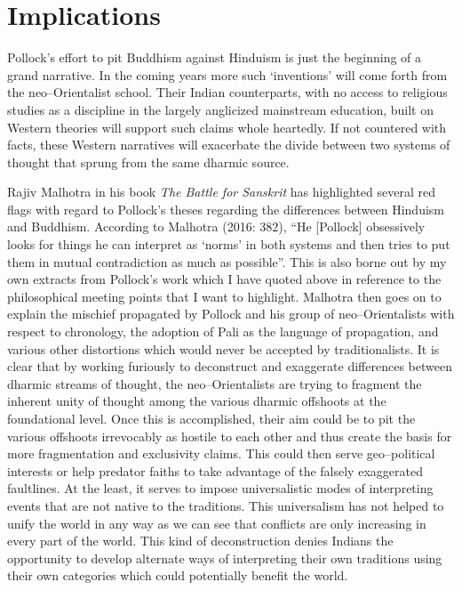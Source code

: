 \section*{Implications}

Pollock’s effort to pit Buddhism against Hinduism is just the beginning of a grand narrative. In the coming years more such ‘inventions’ will come forth from the neo–Orientalist school. Their Indian counterparts, with no access to religious studies as a discipline in the largely anglicized mainstream education, built on Western theories will support such claims whole heartedly. If not countered with facts, these Western narratives will exacerbate the divide between two systems of thought that sprung from the same dharmic source.

Rajiv Malhotra in his book \textit{The Battle for Sanskrit} has highlighted several red flags with regard to Pollock’s theses regarding the differences between Hinduism and Buddhism. According to Malhotra (2016: 382), “He [Pollock] obsessively looks for things he can interpret as ‘norms’ in both systems and then tries to put them in mutual contradiction as much as possible”. This is also borne out by my own extracts from Pollock’s work which I have quoted above in reference to the philosophical meeting points that I want to highlight. Malhotra then goes on to explain the mischief propagated by Pollock and his group of neo–Orientalists with respect to chronology, the adoption of Pali as the language of propagation, and various other distortions which would never be accepted by traditionalists. It is clear that by working furiously to deconstruct and exaggerate differences between dharmic streams of thought, the neo–Orientalists are trying to fragment the inherent unity of thought among the various dharmic offshoots at the foundational level. Once this is accomplished, their aim could be to pit the various offshoots irrevocably as hostile to each other and thus create the basis for more fragmentation and exclusivity claims. This could then serve geo–political interests or help predator faiths to take advantage of the falsely exaggerated faultlines. At the least, it serves to impose universalistic modes of interpreting events that are not native to the traditions. This universalism has not helped to unify the world in any way as we can see that conflicts are only increasing in every part of the world. This kind of deconstruction denies Indians the opportunity to develop alternate ways of interpreting their own traditions using their own categories which could potentially benefit the world.

